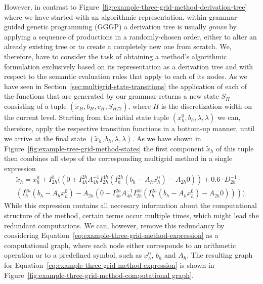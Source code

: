 However, in contrast to Figure~\ref{fig:example-three-grid-method-derivation-tree} where we have started with an algorithmic representation, within grammar-guided genetic programming (GGGP) a derivation tree is usually \emph{grown} by applying a sequence of productions in a randomly-chosen order, either to alter an already existing tree or to create a completely new one from scratch.
We, therefore, have to consider the task of obtaining a method's algorithmic formulation exclusively based on its representation as a derivation tree and with respect to the semantic evaluation rules that apply to each of its nodes.
As we have seen in Section~\ref{sec:multigrid-state-transitions} the application of each of the functions that are generated by our grammar returns a new state $S_H$ consisting of a tuple $\left( \tilde{x}_{H}, b_{H}, c_{H}, S_{H/2}\right)$, where $H$ is the discretization width on the current level.
Starting from the initial state tuple $\left(x_{h}^0, b_{h}, \lambda, \lambda\right)$ we can, therefore, apply the respective transition functions in a bottom-up manner, until we arrive at the final state $\left(\tilde{x}_{h}, b_{h}, \lambda, \lambda\right)$.
As we have shown in Figure~\ref{fig:example-tree-grid-method-states} the first component $\tilde{x}_{h}$ of this tuple then combines all steps of the corresponding multigrid method in a single expression
\begin{multline}
	\tilde{x}_h = x_{h}^0 + I_{2h}^h ((0 + I_{4h}^{2h} A_{4h}^{-1} I_{2h}^{4h} (I_{h}^{2h}(b_{h} - A_h x_{h}^0) - A_{2h} 0)) + 0.6 \cdot D_{2h}^{-1} \cdot \\ 
	(I_{h}^{2h}(b_{h} - A_h x_{h}^0) - A_{2h} (0 + I_{4h}^{2h} A_{4h}^{-1} I_{2h}^{4h} (I_{h}^{2h}(b_{h} - A_h x_{h}^0) - A_{2h} 0)))).
	\label{eq:example-three-grid-method-expression}
\end{multline}
While this expression contains all necessary information about the computational structure of the method, certain terms occur multiple times, which might lead the redundant computations.
We can, however, remove this redundancy by considering Equation~\eqref{eq:example-three-grid-method-expression} as a computational graph, where each node either corresponds to an arithmetic operation or to a predefined symbol, such as $x^0_h$, $b_h$ and $A_h$.
The resulting graph for Equation~\eqref{eq:example-three-grid-method-expression} is shown in Figure~\ref{fig:example-three-grid-method-computational graph}.
